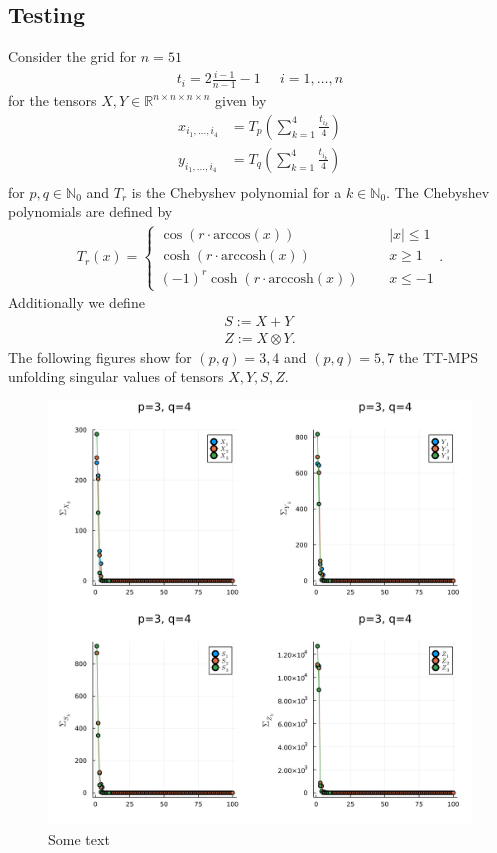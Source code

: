 \documentclass[a4paper]{article}
\begin{document}
\subsection{Testing}
Consider the grid for $n=51$
\begin{align}
    t_i = 2\frac{i-1}{n-1} - 1 \;\;\;\;\; i = 1, \dots ,n
\end{align}
for the tensors $X, Y \in \mathbb{R}^{n\times n\times n\times n}$ given by
\begin{align}
    x_{i_1,\dots, i_4} &= T_p\left(\sum_{k=1}^4 \frac{t_{i_k}}{4}\right) \\
    y_{i_1,\dots, i_4} &= T_q\left(\sum_{k=1}^4 \frac{t_{i_k}}{4}\right) \\
\end{align}
for $p, q \in \mathbb{N}_0$ and $T_r$ is the Chebyshev polynomial for a $k
\in \mathbb{N}_0$. The Chebyshev polynomials are defined by
\begin{align}
    T_r(x) = \begin{cases}
        \cos(r\cdot\text{arccos}(x)) & \;\;\;\;\; |x| \leq 1\\
        \cosh(r\cdot\text{arccosh}(x))&\;\;\;\;\; x \geq 1\\
        (-1)^r\cosh(r\cdot\text{arccosh}(x))&\;\;\;\;\; x \leq -1
            \end{cases}.
\end{align}
Additionally we define
\begin{align}
    S := X + Y\\
    Z := X \otimes Y.
\end{align}
The following figures show for $(p, q) = 3,4$ and $(p, q) = 5,7$ the TT-MPS
unfolding singular values of tensors $X, Y, S, Z$.
\begin{figure}[H]
    \centering
    \includegraphics[width=\textwidth]{./plots/sigma_34.png}
    \caption{Some text}
\end{figure}
\end{document}
